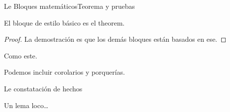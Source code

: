 \documentclass[aspectratio=169]{beamer}
\begin{document}
\begin{frame}[allowframebreaks]{Le Bloques matemáticos}{Teorema y pruebas}
	\begin{theorem}[De ejemplo]
		El bloque de estilo básico es el \alert{theorem}.
	\end{theorem}

	\begin{proof}
		La demostración es que los demás bloques están basados en ese.
	\end{proof}
	
	\begin{example}[Le ejemplo]
		Como este.
	\end{example}
	
	\begin{corollary}
		Podemos incluir corolarios y porquerías.
	\end{corollary}
	
	\begin{fact}
		Le constatación de hechos
	\end{fact}
	
	\begin{lemma}
		Un lema loco\ldots
	\end{lemma}
\end{frame}
\end{document}

